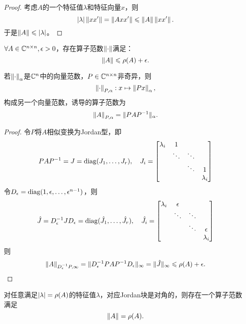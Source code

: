 \begin{proof}
    考虑$A$的一个特征值$\lambda$和特征向量$x$，则 
    \[
        \left\lvert\lambda\right\rvert\left\lVert xx'\right\rVert=\left\lVert Axx'\right\rVert\leqslant\left\lVert A\right\rVert\left\lVert xx'\right\rVert.
    \]
    于是$\left\lVert A\right\rVert\leqslant\left\lvert\lambda\right\rvert$。
\end{proof}

\begin{theorem}
    {}{}
    $\forall A\in\mathbb C^{n\times n},\epsilon>0$，存在算子范数$\left\lVert\cdot\right\rVert$满足：
    \begin{equation}
        \left\lVert A\right\rVert\leqslant\rho(A)+\epsilon.
    \end{equation}
\end{theorem}

\begin{lemma}
    若$\left\lVert\cdot\right\rVert_\alpha$是$\mathbb C^n$中的向量范数，$P\in\mathbb C^{n\times n}$非奇异，则
    \[
        \left\lVert\cdot\right\rVert_{P,\alpha}:x\mapsto\left\lVert Px\right\rVert_\alpha,
    \]
    构成另一个向量范数，诱导的算子范数为
    \[
        \left\lVert A\right\rVert_{P,\alpha}=\lVert PAP^{-1}\rVert_\alpha.
    \]
\end{lemma}

\begin{proof}
    令$P$将$A$相似变换为Jordan型，即
    \[
        PAP^{-1}=J=\operatorname{diag}(J_1,\ldots,J_r),\quad J_i=\begin{bmatrix}
            \lambda_i&1\\
            &\ddots&\ddots\\
            &&\ddots&1\\
            &&&\lambda_i
        \end{bmatrix}
    \]
    令$D_\epsilon=\operatorname{diag}(1,\epsilon,\ldots,\epsilon^{n-1})$，则 
    \[
        \hat J=D_\epsilon^{-1} JD_\epsilon=\operatorname{diag}(\hat J_1,\ldots,\hat J_r),\quad\hat J_i=\begin{bmatrix}
            \lambda_i&\epsilon\\
            &\ddots&\ddots\\
            &&\ddots&\epsilon\\
            &&&\lambda_i
        \end{bmatrix}
    \]
    则
    \[
        \left\lVert A\right\rVert_{D_\epsilon^{-1} P,\infty}=\lVert D_\epsilon^{-1} PAP^{-1} D_\epsilon\rVert_\infty=\lVert\hat J\rVert_\infty\leqslant\rho(A)+\epsilon.
        \qedhere
    \]
\end{proof}

\begin{remark}
    对任意满足$\left\lvert\lambda\right\rvert=\rho(A)$的特征值$\lambda$，对应Jordan块是对角的，则存在一个算子范数满足
    \[
        \left\lVert A\right\rVert=\rho(A).
    \]
\end{remark}

